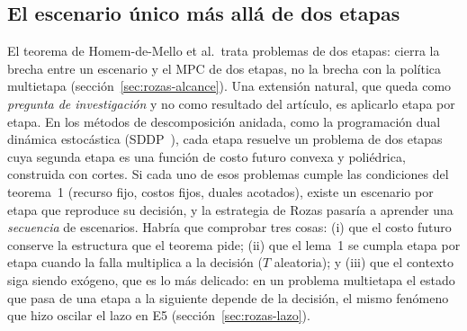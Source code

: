 \subsection{El escenario único más allá de dos etapas}
El teorema de Homem-de-Mello et al.\ trata problemas de dos etapas: cierra la brecha entre un
escenario y el MPC de dos etapas, no la brecha con la política multietapa
(sección~\ref{sec:rozas-alcance}). Una extensión natural, que queda como \emph{pregunta de
investigación} y no como resultado del artículo, es aplicarlo etapa por etapa. En los métodos de
descomposición anidada, como la programación dual dinámica estocástica (SDDP~\cite{pereira1991}),
cada etapa resuelve un problema de dos etapas cuya segunda etapa es una función de costo futuro
convexa y poliédrica, construida con cortes. Si cada uno de esos problemas cumple las condiciones
del teorema~1 (recurso fijo, costos fijos, duales acotados), existe un escenario por etapa que
reproduce su decisión, y la estrategia de Rozas pasaría a aprender una \emph{secuencia} de
escenarios. Habría que comprobar tres cosas: (i) que el costo futuro conserve la estructura que el
teorema pide; (ii) que el lema~1 se cumpla etapa por etapa cuando la falla multiplica a la decisión
($T$ aleatoria); y (iii) que el contexto siga siendo exógeno, que es lo más delicado: en un
problema multietapa el estado que pasa de una etapa a la siguiente depende de la decisión, el mismo
fenómeno que hizo oscilar el lazo en E5 (sección~\ref{sec:rozas-lazo}).


